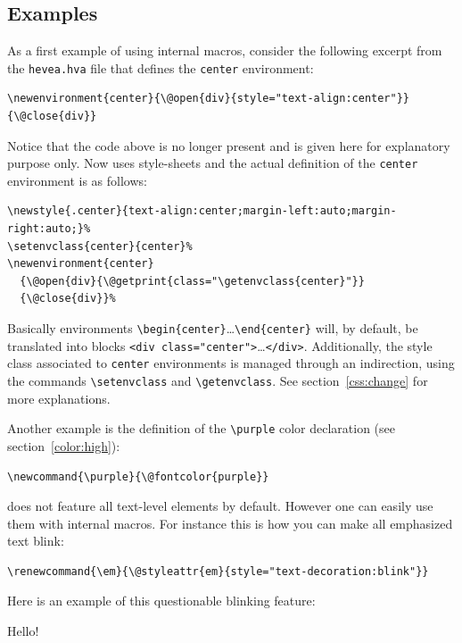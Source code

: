 \subsection{Examples}
As a first example of using internal macros, consider the following
excerpt from the \texttt{hevea.hva} file that
defines the \verb+center+ environment:
\begin{verbatim}
\newenvironment{center}{\@open{div}{style="text-align:center"}}{\@close{div}}
\end{verbatim}
%
Notice that the code above is no longer present and is given here
for explanatory purpose only.
Now \hevea{} uses style-sheets and the actual definition of the
\verb+center+ environment is as follows:
\begin{verbatim}
\newstyle{.center}{text-align:center;margin-left:auto;margin-right:auto;}%
\setenvclass{center}{center}%
\newenvironment{center}
  {\@open{div}{\@getprint{class="\getenvclass{center}"}}
  {\@close{div}}%
\end{verbatim}
Basically environments \verb+\begin{center}+\ldots\verb+\end{center}+ will, by
default, be translated into blocks
\verb+<div class="center">+\ldots\verb+</div>+.
Additionally, the style class associated to \verb+center+ environments
is managed through an indirection, using the
commands \verb+\setenvclass+ and \verb+\getenvclass+.
See section~\ref{css:change} for more explanations.

Another example is the definition of the \verb+\purple+
color declaration (see section~\ref{color:high}):
\begin{verbatim}
\newcommand{\purple}{\@fontcolor{purple}}
\end{verbatim}

\hevea{} does not feature all text-level elements by default.
However one can easily use them with internal macros.
For instance this is how you can make all emphasized text blink:
\begin{verbatim}
\renewcommand{\em}{\@styleattr{em}{style="text-decoration:blink"}}
\end{verbatim}
\begin{htmlonly}
Here is an example of this questionable blinking feature:
\begin{center}
{Hello!}
\end{center}
\end{htmlonly}

